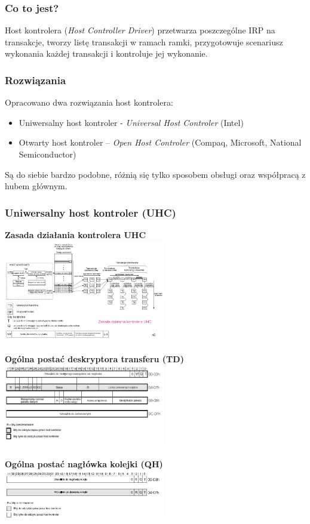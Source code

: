 	\subsubsection{Co to jest?}
	Host kontrolera (\emph{Host Controller Driver}) przetwarza poszczególne IRP na transakcje, tworzy listę transakcji  w ramach ramki, przygotowuje scenariusz wykonania każdej transakcji i kontroluje jej wykonanie.
	\subsubsection{Rozwiązania}
	Opracowano dwa rozwiązania host kontrolera:
	\begin{itemize}
		\item Uniwersalny host kontroler - \emph{Universal Host Controler} (Intel)
		\item Otwarty host kontroler – \emph{Open Host Controler} (Compaq, Microsoft, National Semiconductor)
	\end{itemize}
	Są do siebie bardzo podobne, różnią się tylko sposobem obsługi oraz współpracą z hubem głównym.
	\subsubsection{Uniwersalny host kontroler (UHC)}
	\textbf{Zasada działania kontrolera UHC}\\
	\includegraphics[width=7cm]{./wyklady/USB_46_1.jpg}\\\\
	\textbf{Ogólna postać deskryptora transferu (TD)}\\
	\includegraphics[width=7cm]{./wyklady/USB_47_1.jpg}\\\\
	\textbf{Ogólna postać nagłówka kolejki (QH)}\\
	\includegraphics[width=7cm]{./wyklady/USB_48_1.pdf}
